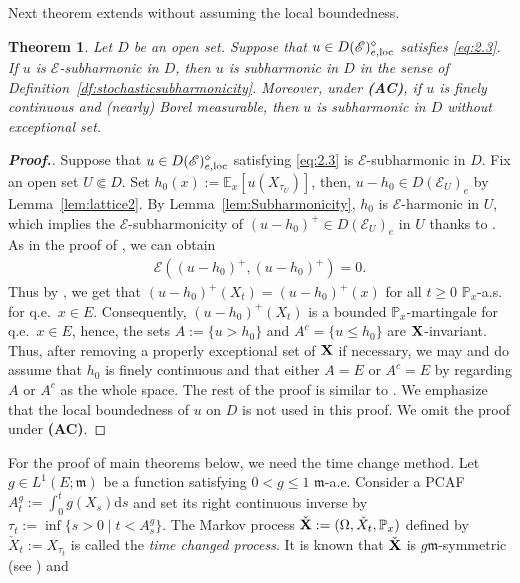 \documentclass[12pt,a4paper]{article}
\newtheorem{thm}{Theorem}[section]
\renewcommand{\d}{\mathrm{d}}
\newcommand{\m}{\mathfrak{m} }
\newcommand{\loc}{{\rm loc}}
\newcommand{\1}{{\bf 1}}
\begin{document}
Next theorem extends \cite[Theorem~3.10]{CK} without assuming the local boundedness.  

\begin{thm}\label{thm:3.10}
Let $D$ be an open set. 
Suppose that $u\in D(\mathscr{E})_{e,\loc}^{\diamond}$ satisfies \eqref{eq:2.3}.  
If $u$ is $\mathscr{E}$-subharmonic in $D$, then $u$ is subharmonic in $D$ in the sense of Definition~\ref{df:stochasticsubharmonicity}.  
Moreover, under {\bf (AC)}, if $u$ is finely continuous and {\rm(}nearly{\rm)} Borel measurable, then $u$ is subharmonic in $D$ without exceptional set.
\end{thm}
\begin{proof}[{\bf Proof.}]
Suppose that $u\in D(\mathscr{E})_{e,\loc}^{\diamond}$ satisfying \eqref{eq:2.3} is $\mathscr{E}$-subharmonic in $D$.
 Fix an open set $U \Subset D$.
Set $h_0(x):=\mathbb{E}_x[{u}(X_{\tau_U})]$, then, $u-h_0\in D(\mathscr{E}_U)_e$ by Lemma~\ref{lem:lattice2}. 
By Lemma~\ref{lem:Subharmonicity}, $h_0$ is $\mathscr{E}$-harmonic in $U$, which implies the 
$\mathscr{E}$-subharmonicity of $(u-h_0)^+\in D(\mathscr{E}_U)_e$ 
in $U$ thanks to \cite[Lemma~3.2]{CK}. 
As in the proof of \cite[Theorem~3.10]{CK}, we can obtain 
\begin{align*}
\mathscr{E}((u-h_0)^+,(u-h_0)^+)=0.
\end{align*} 
Thus by \cite[Lemma~2.2]{Chen}, we get that 
$(u-h_0)^+(X_t)=(u-h_0)^+(x)$ for all $t\geq0$ $\mathbb{P}_x$-a.s. for q.e.~$x\in E$. Consequently, $(u-h_0)^+(X_t)$ is a bounded $\mathbb{P}_x$-martingale for q.e.~$x\in E$, hence, the sets $A := \{u > h_0\}$ and $A^c = \{u\leq  h_0\}$ are ${\bf X}$-invariant. 
Thus, after removing a properly exceptional set of ${\bf X}$ if necessary, we may and do assume that $h_0$ is finely continuous and that either $A = E$ or $A^c = E$ by regarding $A$ or $A^c$ as the whole space.  
The rest of the proof is similar to \cite[proof of Theorem~3.10]{CK}. 
We emphasize that the local boundedness of $u$ on $D$ is not used in this proof. We omit the proof under {\bf (AC)}.
\end{proof}
For the proof of main theorems below, we need the time change method. 
Let $g\in L^1(E;{\m})$ be a function satisfying $0<g\leq1$ ${\m}$-a.e. 
Consider a PCAF $A_t^g:=\int_0^tg(X_s){\d} s$ and set its right continuous inverse by $\tau_t:=\inf\{s>0\mid t<A_s^g\}$. The Markov process 
 $\check{\bf X}:=(\Omega,\check{X}_t,\mathbb{P}_x)$ defined by $\check{X}_t:=X_{\tau_t}$ is called the {\it time changed process}. 
 It is known that $\check{\bf X}$ is $g{\m}$-symmetric (see \cite[Theorem~6.2.1]{FOT}) and 
\end{document}
